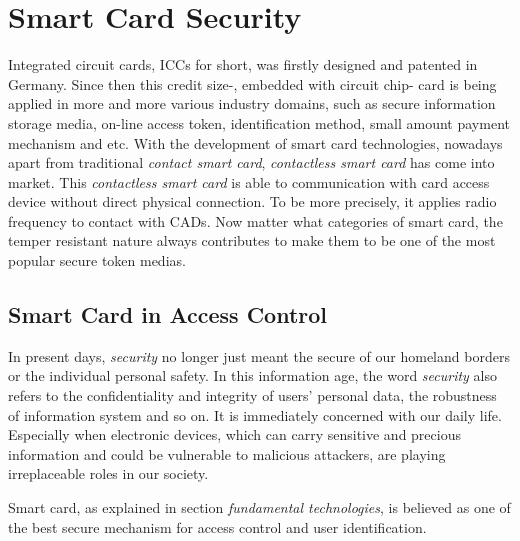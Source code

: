 \section{Smart Card Security}
Integrated circuit cards, ICCs for short, was firstly designed and patented in Germany\cite{smart_card_history}. Since then this credit size-, embedded with circuit chip- card is being applied in more and more various industry domains, such as secure information storage media, on-line access token, identification method, small amount payment mechanism and etc. With the development of smart card technologies, nowadays apart from traditional \emph{contact smart card}, \emph{contactless smart card}\cite{smart_card_contactless} has come into market. This \emph{contactless smart card} is able to communication with card access device without direct physical connection. To be more precisely, it applies radio frequency to contact with CADs. Now matter what categories of smart card, the temper resistant nature always contributes to make them to be one of the most popular secure token medias.
\subsection{Smart Card in Access Control}\label{secSCAC}
In present days, \emph{security} no longer just meant the secure of our homeland borders or the individual personal safety. In this information age, the word \emph{security} also refers to the confidentiality and integrity of users' personal data, the robustness of information system and so on. It is immediately concerned with our daily life. Especially when electronic devices, which can carry sensitive and precious information and could be vulnerable to malicious attackers, are playing irreplaceable roles in our society. 

Smart card, as explained in section \emph{fundamental technologies}, is believed as one of the best secure mechanism for access control and user identification. 

